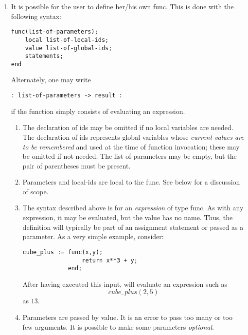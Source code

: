 \begin{enumerate}
    \item
    It is possible for the user to define her/his own func.
    This is done with the following syntax:

\begin{indented}
\begin{verbatim}
func(list-of-parameters);
    local list-of-local-ids;
    value list-of-global-ids;
    statements;
end
\end{verbatim}
\end{indented}

Alternately, one may write
\begin{indented}
\begin{verbatim}
: list-of-parameters -> result :
\end{verbatim}
\end{indented}
if the function simply consists of evaluating an expression.

	\begin{enumerate}

	\item
	The declaration of  ids
	may be omitted if no local variables are needed.
	The declaration of  ids 
	represents global variables
	whose {\em current values are to be remembered\/}
	and used at the time of function invocation;
	these may be omitted if not needed.
	The list-of-parameters may be empty,
	but the pair of parentheses must be present.

\pagebreak[1]
	\item
	 Parameters and local-ids are local to the func.
	 See below for a discussion of scope.

\pagebreak[1]
	\item
	The syntax described above is for an {\em expression\/}
	of type func.
	As with any expression,
	it may be evaluated, but the value has no name.
	Thus, the definition will typically be part of an assignment
	statement or passed as a parameter.
	As a very simple example, consider:

\begin{indented}
\begin{verbatim}
cube_plus := func(x,y);
                 return x**3 + y;
             end;
\end{verbatim}
\end{indented}

	After having executed this input, \ISETL{} will evaluate an
	expression such as \[cube\_\,plus(2,5)\] as \(13\).

\pagebreak[1]
	\item
	Parameters are passed by value.
	It is an error to pass too many or too few arguments.
	It is possible to make some parameters {\em optional\/}.


\end{enumerate}
\end{enumerate}
